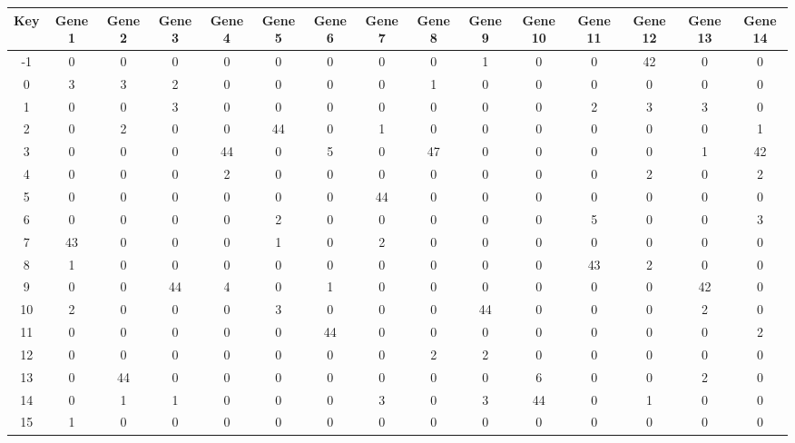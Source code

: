 \begin{tabular}{|c|c|c|c|c|c|c|c|c|c|c|c|c|c|c|}
\hline
Key & Gene 1 & Gene 2 & Gene 3 & Gene 4 & Gene 5 & Gene 6 & Gene 7 & Gene 8 & Gene 9 & Gene 10 & Gene 11 & Gene 12 & Gene 13 & Gene 14 \\
\hline
-1 & 0 & 0 & 0 & 0 & 0 & 0 & 0 & 0 & 1 & 0 & 0 & 42 & 0 & 0 \\
0 & 3 & 3 & 2 & 0 & 0 & 0 & 0 & 1 & 0 & 0 & 0 & 0 & 0 & 0 \\
1 & 0 & 0 & 3 & 0 & 0 & 0 & 0 & 0 & 0 & 0 & 2 & 3 & 3 & 0 \\
2 & 0 & 2 & 0 & 0 & 44 & 0 & 1 & 0 & 0 & 0 & 0 & 0 & 0 & 1 \\
3 & 0 & 0 & 0 & 44 & 0 & 5 & 0 & 47 & 0 & 0 & 0 & 0 & 1 & 42 \\
4 & 0 & 0 & 0 & 2 & 0 & 0 & 0 & 0 & 0 & 0 & 0 & 2 & 0 & 2 \\
5 & 0 & 0 & 0 & 0 & 0 & 0 & 44 & 0 & 0 & 0 & 0 & 0 & 0 & 0 \\
6 & 0 & 0 & 0 & 0 & 2 & 0 & 0 & 0 & 0 & 0 & 5 & 0 & 0 & 3 \\
7 & 43 & 0 & 0 & 0 & 1 & 0 & 2 & 0 & 0 & 0 & 0 & 0 & 0 & 0 \\
8 & 1 & 0 & 0 & 0 & 0 & 0 & 0 & 0 & 0 & 0 & 43 & 2 & 0 & 0 \\
9 & 0 & 0 & 44 & 4 & 0 & 1 & 0 & 0 & 0 & 0 & 0 & 0 & 42 & 0 \\
10 & 2 & 0 & 0 & 0 & 3 & 0 & 0 & 0 & 44 & 0 & 0 & 0 & 2 & 0 \\
11 & 0 & 0 & 0 & 0 & 0 & 44 & 0 & 0 & 0 & 0 & 0 & 0 & 0 & 2 \\
12 & 0 & 0 & 0 & 0 & 0 & 0 & 0 & 2 & 2 & 0 & 0 & 0 & 0 & 0 \\
13 & 0 & 44 & 0 & 0 & 0 & 0 & 0 & 0 & 0 & 6 & 0 & 0 & 2 & 0 \\
14 & 0 & 1 & 1 & 0 & 0 & 0 & 3 & 0 & 3 & 44 & 0 & 1 & 0 & 0 \\
15 & 1 & 0 & 0 & 0 & 0 & 0 & 0 & 0 & 0 & 0 & 0 & 0 & 0 & 0 \\
\hline
\end{tabular}